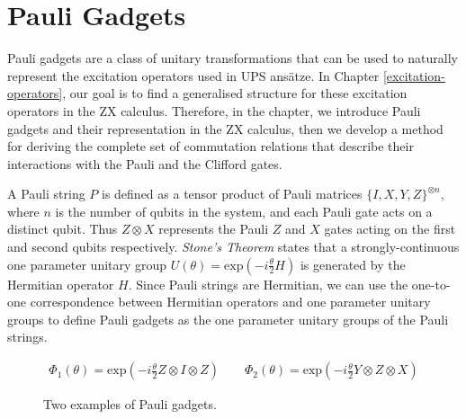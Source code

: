 \chapter{Pauli Gadgets}%
\label{pauli-gadgets}

Pauli gadgets are a class of unitary transformations that can be used to naturally represent the excitation operators used in UPS ansätze. In Chapter \ref{excitation-operators}, our goal is to find a generalised structure for these excitation operators in the ZX calculus. Therefore, in the chapter, we introduce Pauli gadgets and their representation in the ZX calculus, then we develop a method for deriving the complete set of commutation relations that describe their interactions with the Pauli and the Clifford gates.

A Pauli string $P$ is defined as a tensor product of Pauli matrices $\{I, X, Y, Z\}^{\otimes n}$, where $n$ is the number of qubits in the system, and each Pauli gate acts on a distinct qubit. Thus $Z \otimes X$ represents the Pauli $Z$ and $X$ gates acting on the first and second qubits respectively. \textit{Stone's Theorem} \cite{Stone1932} states that a strongly-continuous one parameter unitary group $U(\theta) = \text{exp} \left(- i \frac{\theta}{2} H \right)$ is generated by the Hermitian operator $H$. Since Pauli strings are Hermitian, we can use the one-to-one correspondence between Hermitian operators and one parameter unitary groups to define Pauli gadgets as the one parameter unitary groups of the Pauli strings.

\begin{figure}[H]
    \centering
    \begin{gather*}
        \Phi_1(\theta) = \text{exp}\left(- i \frac{\theta}{2} Z \otimes I \otimes Z \right) \qquad
        \Phi_2(\theta) = \text{exp}\left(- i \frac{\theta}{2} Y \otimes Z \otimes X \right)%
    \end{gather*}
    \caption{Two examples of Pauli gadgets.}
\end{figure}
